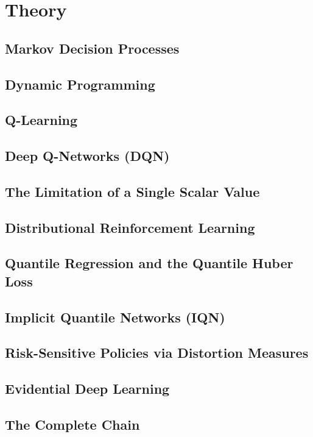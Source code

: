 \chapter{Theory}


\section{Markov Decision Processes}

\section{Dynamic Programming}

\section{Q-Learning}

\section{Deep Q-Networks (DQN)}

\section{The Limitation of a Single Scalar Value}

\section{Distributional Reinforcement Learning}

\section{Quantile Regression and the Quantile Huber Loss}

\section{Implicit Quantile Networks (IQN)}

\section{Risk-Sensitive Policies via Distortion Measures}

\section{Evidential Deep Learning}

\section{The Complete Chain}
